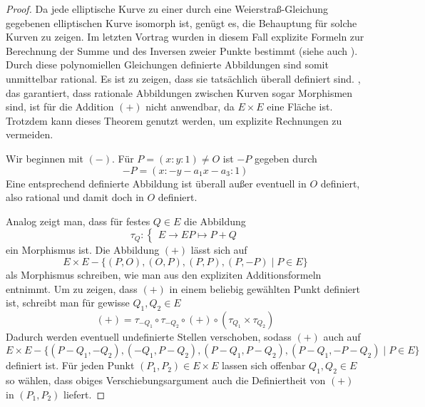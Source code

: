 \documentclass{amsart}
\theoremstyle{plain}
\theoremstyle{definition}
\begin{document}
\begin{proof}
	Da jede elliptische Kurve zu einer durch eine Weierstraß-Gleichung gegebenen elliptischen Kurve isomorph ist, genügt es, die Behauptung für solche Kurven zu zeigen.
	Im letzten Vortrag wurden in diesem Fall explizite Formeln zur Berechnung der Summe und des Inversen zweier Punkte bestimmt (siehe auch \cite[III. 2.3]{silverman}).
	Durch diese polynomiellen Gleichungen definierte Abbildungen sind somit unmittelbar rational.
	Es ist zu zeigen, dass sie tatsächlich überall definiert sind.
	\cite[II. Th. 2.3]{silverman}, das garantiert, dass rationale Abbildungen zwischen Kurven sogar Morphismen sind, ist für die Addition $(+)$ nicht anwendbar, da $E \times E$ eine Fläche ist.
	Trotzdem kann dieses Theorem genutzt werden, um explizite Rechnungen zu vermeiden.

	Wir beginnen mit $(-)$. Für $P = (x : y : 1) \neq O$ ist $-P$ gegeben durch
	\begin{equation*}
		-P = (x : -y - a_1 x - a_3 : 1)
	\end{equation*}
	Eine entsprechend definierte Abbildung ist überall außer eventuell in $O$ definiert, also rational und damit doch  in $O$ definiert.

	Analog zeigt man, dass für festes $Q \in E$ die Abbildung
	\begin{equation*}
		\tau_Q : \begin{cases}
			E \rightarrow E
			P \mapsto P + Q
		\end{cases}
	\end{equation*}
	ein Morphismus ist.
	Die Abbildung $(+)$ lässt sich auf
	\begin{equation*}
		E \times E - \{(P, O), (O, P), (P, P), (P, -P) \mid P \in E \}
	\end{equation*}
	als Morphismus schreiben, wie man aus den expliziten Additionsformeln entnimmt.
	Um zu zeigen, dass $(+)$ in einem beliebig gewählten Punkt definiert ist, schreibt man für gewisse $Q_1, Q_2 \in E$
	\begin{equation*}
		(+) = \tau_{-Q_1} \circ \tau_{-Q_2} \circ (+) \circ (\tau_{Q_1} \times \tau_{Q_2})
	\end{equation*}
	Dadurch werden eventuell undefinierte Stellen \glqq verschoben\grqq, sodass $(+)$ auch auf
	\begin{equation*}
		E \times E - \{(P - Q_1, -Q_2), (-Q_1, P - Q_2), (P - Q_1, P - Q_2), (P - Q_1, -P - Q_2) \mid P \in E \}
	\end{equation*}
	definiert ist.
	Für jeden Punkt $(P_1, P_2) \in E \times E$ lassen sich offenbar $Q_1, Q_2 \in E$ so wählen, dass obiges Verschiebungsargument auch die Definiertheit von $(+)$ in $(P_1, P_2)$ liefert.
\end{proof}


\printbibliography
\end{document}
